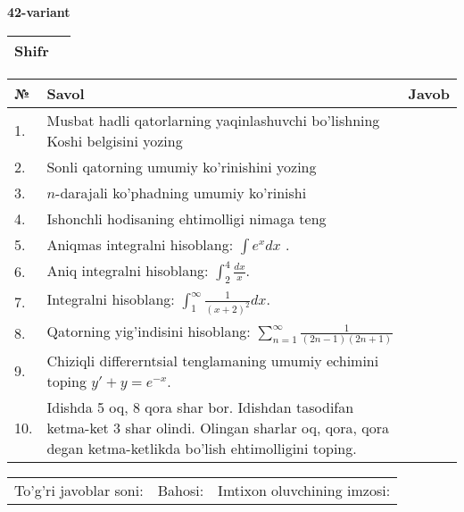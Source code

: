 \documentclass{article}
\begin{document}
  \egroup
  
  \newpage
  
  
  \textbf{42-variant}\\
  
  \bgroup
  \def\arraystretch{1.6} %
  
  \begin{tabular}{|m{5.7cm}|m{9.5cm}|}
  \hline
  Shifr & \\
  \hline
  \end{tabular}
  
  \vspace{1cm}
  
  \begin{tabular}{|m{0.7cm}|m{10cm}|m{4cm}|}
  \hline
  № & Savol & Javob \\
  \hline
  1. & Musbat hadli qatorlarning yaqinlashuvchi bo'lishning Koshi belgisini yozing &  \\
  \hline
  2. & Sonli qatorning umumiy ko'rinishini yozing &  \\
  \hline
  3. & \(n\)-darajali ko'phadning umumiy ko'rinishi &  \\
  \hline
  4. & Ishonchli hodisaning ehtimolligi nimaga teng &  \\
  \hline
  5. & Aniqmas integralni hisoblang: \(\int {e^{x}dx}\) . &  \\
  \hline
  6. & Aniq integralni hisoblang: \(\int_{2}^{4}\frac{dx}{x}\). &  \\
  \hline
  7. & Integralni hisoblang: \(\int_{1}^{\infty}{\frac{1}{(x + 2)^{2}}dx}\). &  \\
  \hline
  8. & Qatorning yig'indisini hisoblang: \(\sum_{n = 1}^{\infty}\frac{1}{(2n - 1)(2n + 1)}\) &  \\
  \hline
  9. & Chiziqli differerntsial tenglamaning umumiy echimini toping \(y' + y = e^{- x}\). &  \\
  \hline
  10. & Idishda 5 oq, 8 qora shar bor. Idishdan tasodifan ketma-ket 3 shar olindi. Olingan sharlar oq, qora, qora degan ketma-ketlikda bo'lish ehtimolligini toping. &  \\
  \hline
  \end{tabular}
  
  \vspace{1cm}
  
  \begin{tabular}{lll}
  To'g'ri javoblar soni: \underline{\hspace{1.5cm}} & 
  Bahosi: \underline{\hspace{1.5cm}} & 
  Imtixon oluvchining imzosi: \underline{\hspace{2cm}} \\
  \end{tabular}
  
\end{document}
